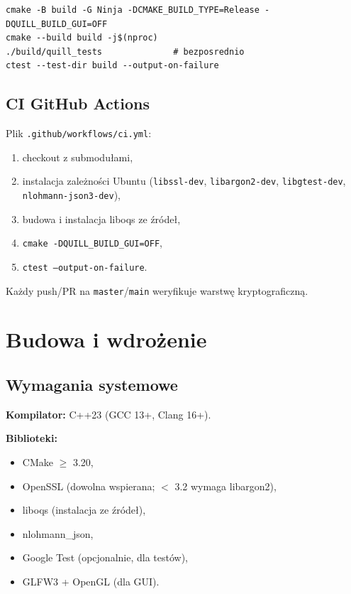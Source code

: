 \documentclass[12pt,a4paper]{article}
\begin{document}
\begin{lstlisting}[style=bash]
cmake -B build -G Ninja -DCMAKE_BUILD_TYPE=Release -DQUILL_BUILD_GUI=OFF
cmake --build build -j$(nproc)
./build/quill_tests              # bezposrednio
ctest --test-dir build --output-on-failure
\end{lstlisting}

\subsection{CI GitHub Actions}

Plik \texttt{.github/workflows/ci.yml}:
\begin{enumerate}
    \item checkout z submodułami,
    \item instalacja zależności Ubuntu (\texttt{libssl-dev}, \texttt{libargon2-dev}, \texttt{libgtest-dev}, \texttt{nlohmann-json3-dev}),
    \item budowa i instalacja liboqs ze źródeł,
    \item \texttt{cmake -DQUILL\_BUILD\_GUI=OFF},
    \item \texttt{ctest --output-on-failure}.
\end{enumerate}

Każdy push/PR na \texttt{master}/\texttt{main} weryfikuje warstwę kryptograficzną.

\section{Budowa i wdrożenie}

\subsection{Wymagania systemowe}

\textbf{Kompilator:} C++23 (GCC 13+, Clang 16+).

\textbf{Biblioteki:}
\begin{itemize}
    \item CMake $\geq$ 3.20,
    \item OpenSSL (dowolna wspierana; $<$ 3.2 wymaga libargon2),
    \item liboqs (instalacja ze źródeł),
    \item nlohmann\_json,
    \item Google Test (opcjonalnie, dla testów),
    \item GLFW3 + OpenGL (dla GUI).
\end{itemize}
\end{document}
